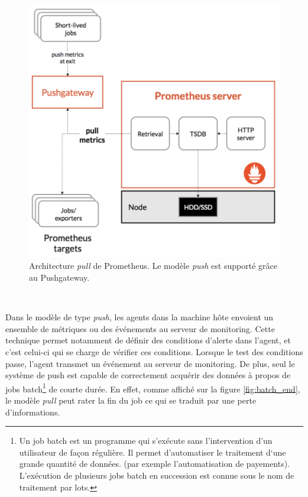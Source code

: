 \begin{figure}[ht!]
  \centering
  \includegraphics[scale=0.4]{img/state_of_the_art/prometheus_archi_simple.png}
  \caption{Architecture \textit{pull} de Prometheus. Le modèle \textit{push} est supporté grâce au Pushgateway.}
  \label{fig:archi_prom_simple}
\end{figure}

~

\noindent
Dans le modèle de type \textit{push}, les agents dans la machine hôte envoient un ensemble de métriques ou des événements au serveur de monitoring. Cette technique permet notamment de définir des conditions d'alerte dans l'agent, et c'est celui-ci qui se charge de vérifier ces conditions. Lorsque le test des conditions passe, l'agent transmet un événement au serveur de monitoring. De plus, seul le système de push est capable de correctement acquérir des données à propos de jobs batch\footnote{Un job batch est un programme qui s'exécute sans l'intervention d'un utilisateur de façon régulière. Il permet d'automatiser le traitement d‘une grande quantité de données. (par exemple l'automatisation de payements). L'exécution de plusieurs jobs batch en succession est connue sous le nom de traitement par lots.} de courte durée. \cite{blog_monitoring, prometheus_tuto} En effet, comme affiché sur la figure \ref{fig:batch_end}, le modèle \textit{pull} peut rater la fin du job ce qui se traduit par une perte d'informations.

